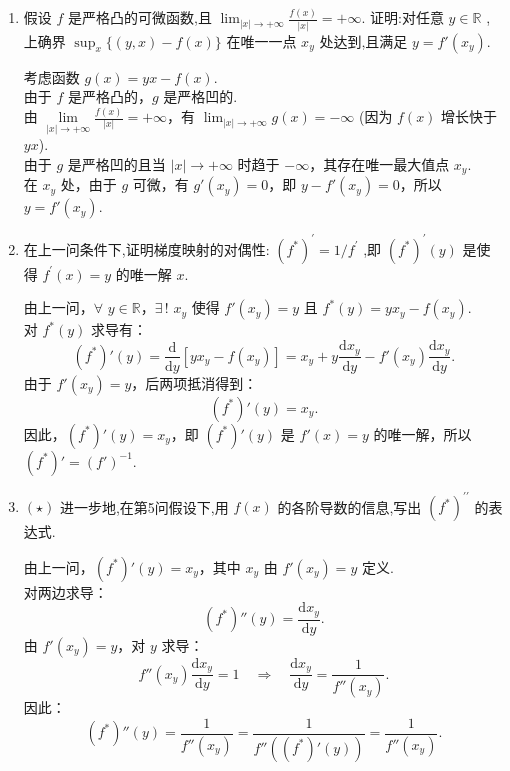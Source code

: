\begin{enumerate}
    \item[5.]假设 \(f\) 是严格凸的可微函数,且 \(\displaystyle \lim_{|x| \to +\infty} \frac{f(x)}{|x|} = +\infty\). 
    证明:对任意 \(\displaystyle y \in \mathbb{R}\) ,上确界 \(\displaystyle \sup_{x} \{(y, x) - f(x)\}\) 在唯一一点 \(x_{y}\) 处达到,且满足 \(\displaystyle y = f'(x_{y})\).
    \begin{solution}
        考虑函数 \( g(x) = yx - f(x) \).\\
        由于 \( f \) 是严格凸的，\( g \) 是严格凹的.\\
        由 \(\displaystyle \underset{{|x|\to+\infty}}{\lim}\frac{f(x)}{|x|}=+\infty \)，有 \( \lim_{|x|\to+\infty} g(x) = -\infty \) (因为 \( f(x) \) 增长快于 \( y x \)).\\
        由于 \( g \) 是严格凹的且当 \( |x| \to +\infty \) 时趋于 \( -\infty \)，其存在唯一最大值点 \( x_y \).\\  
        在 \( x_y \) 处，由于 \( g \) 可微，有 \( g'(x_y) = 0 \)，即 \( y - f'(x_y) = 0 \)，所以 \( y = f'(x_y) \).
    \end{solution}
    
    \item[6.]在上一问条件下,证明梯度映射的对偶性: \(\displaystyle(f^{*})^{\prime} = 1 / f^{\prime}\) ,即 \(\displaystyle(f^{*})^{\prime}(y)\) 是使得 \(\displaystyle f^{\prime}(x) = y\) 的唯一解 \(x\).
    \begin{solution}
        由上一问，$\forall$ \( y\in\mathbb{R} \)，$\exists \,!$ \( x_y \) 使得 \( f'(x_y) = y \) 且 \( f^*(y) = y x_y - f(x_y) \).\\
        对 \( f^*(y) \) 求导有：
        \[
        (f^*)'(y) = \frac{\mathrm{d}}{\mathrm{d}y} [ y x_y - f(x_y) ] = x_y + y \frac{\mathrm{d} x_y}{\mathrm{d}y} - f'(x_y) \frac{\mathrm{d} x_y}{\mathrm{d}y}.
        \]
        由于 \(\displaystyle f'(x_y) = y \)，后两项抵消得到：
        \[
        (f^*)'(y) = x_y.
        \]
        因此，\(\displaystyle (f^*)'(y) = x_y \)，即 \(\displaystyle (f^*)'(y) \) 是 \( f'(x) = y \) 的唯一解，所以 \( (f^*)' = (f')^{-1} \).
    \end{solution}
    
    \item[7.]\((\star)\) 进一步地,在第5问假设下,用 \(f(x)\) 的各阶导数的信息,写出 \(\displaystyle(f^{*})^{\prime \prime}\) 的表达式.
    \begin{solution}
        由上一问，\( (f^*)'(y) = x_y \)，其中 \( x_y \) 由 \( f'(x_y) = y \) 定义.\\
        对两边求导：
        \[
        (f^*)''(y) = \frac{\mathrm{d} x_y}{\mathrm{d}y}.
        \]
        由 \( f'(x_y) = y \)，对 \( y \) 求导：
        \[
        f''(x_y) \frac{\mathrm{d} x_y}{\mathrm{d}y} = 1 \quad \Rightarrow \quad \frac{\mathrm{d} x_y}{\mathrm{d}y} = \frac{1}{f''(x_y)}.
        \]
        因此：
        \[
        (f^*)''(y) = \frac{1}{f''(x_y)} = \frac{1}{f''((f^*)'(y))}=\frac{1}{f''(x_y)}.
        \]
    \end{solution}
\end{enumerate}